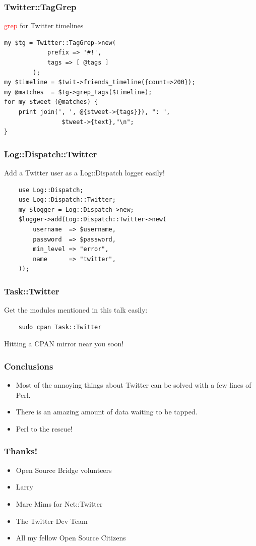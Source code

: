 \documentclass[12pt]{beamer}
\begin{document}
\begin{frame}[fragile]
    \frametitle{Twitter::TagGrep}
    \textcolor{red}{grep} for Twitter timelines
    \begin{verbatim}
my $tg = Twitter::TagGrep->new( 
            prefix => '#!',
            tags => [ @tags ] 
        );
my $timeline = $twit->friends_timeline({count=>200});
my @matches  = $tg->grep_tags($timeline);
for my $tweet (@matches) {
    print join(', ', @{$tweet->{tags}}), ": ",
                $tweet->{text},"\n";
}
    \end{verbatim}
\end{frame}


\begin{frame}[fragile]
    \frametitle{Log::Dispatch::Twitter}
    Add a Twitter user as a Log::Dispatch logger easily!
    \begin{verbatim}
    use Log::Dispatch;
    use Log::Dispatch::Twitter;
    my $logger = Log::Dispatch->new;
    $logger->add(Log::Dispatch::Twitter->new(
        username  => $username,
        password  => $password,
        min_level => "error",
        name      => "twitter",
    ));
    \end{verbatim}
\end{frame}

\begin{frame}[fragile]
    \frametitle{Task::Twitter}
Get the modules mentioned in this talk easily:
    \begin{verbatim}
    sudo cpan Task::Twitter
    \end{verbatim}
Hitting a CPAN mirror near you soon!
\end{frame}

\begin{frame}[fragile]
    \frametitle{Conclusions}
    \begin{itemize}
    \item Most of the annoying things about Twitter can be solved with a few lines of Perl.
    \item There is an amazing amount of data waiting to be tapped.
    \item Perl to the rescue!
    \end{itemize}

\end{frame}

\begin{frame}[fragile]
    \frametitle{Thanks!}
    \begin{itemize}
    \item Open Source Bridge volunteers
    \item Larry
    \item Marc Mims for Net::Twitter
    \item The Twitter Dev Team
    \item All my fellow Open Source Citizens
    \end{itemize}
\end{frame}
\end{document}
